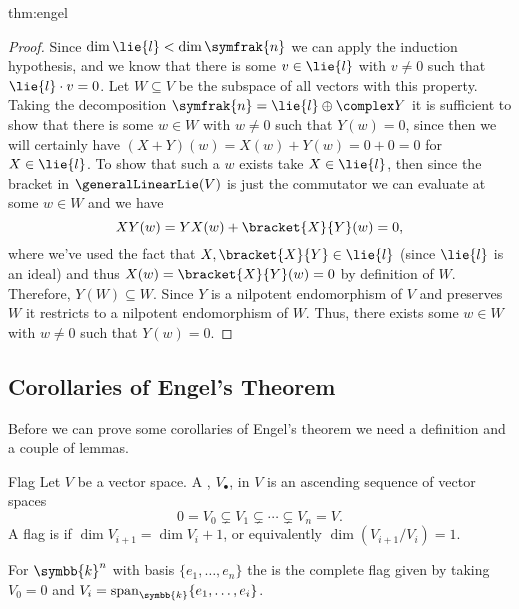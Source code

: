 \documentclass[fleqn]{NotesClass}
\renewcommand{\field}{\symbb{k}}
\DeclareMathOperator{\Span}{span}
\newcommand{\nilpotentLie}{\symfrak{n}}
\begin{document}
\begin{thm}{}{thm:engel}
\begin{proof}
            Since \(\dim \lie{l} < \dim \nilpotentLie\) we can apply the induction hypothesis, and we know that there is some \(v \in \lie{l}\) with \(v \ne 0\) such that \(\lie{l} \cdot v = 0\).
            Let \(W \subseteq V\) be the subspace of all vectors with this property.
            Taking the decomposition \(\nilpotentLie = \lie{l} \oplus \complex Y\) it is sufficient to show that there is some \(w \in W\) with \(w \ne 0\) such that \(Y(w) = 0\), since then we will certainly have \((X + Y)(w) = X(w) + Y(w) = 0 + 0 = 0\) for \(X \in \lie{l}\).
            To show that such a \(w\) exists take \(X \in \lie{l}\), then since the bracket in \(\generalLinearLie(V)\) is just the commutator we can evaluate at some \(w \in W\) and we have
            \begin{equation}
                XY(w) = YX(w) + \bracket{X}{Y}(w) = 0,
            \end{equation}
            where we've used the fact that \(X, \bracket{X}{Y} \in \lie{l}\) (since \(\lie{l}\) is an ideal) and thus \(X(w) = \bracket{X}{Y}(w) = 0\) by definition of \(W\).
            Therefore, \(Y(W) \subseteq W\).
            Since \(Y\) is a nilpotent endomorphism of \(V\) and preserves \(W\) it restricts to a nilpotent endomorphism of \(W\).
            Thus, there exists some \(w \in W\) with \(w \ne 0\) such that \(Y(w) = 0\).
        \end{proof}
    \end{thm}
    
    \subsection{Corollaries of Engel's Theorem}
    Before we can prove some corollaries of Engel's theorem we need a definition and a couple of lemmas.
    
    \begin{dfn}{Flag}{}
        Let \(V\) be a vector space.
        A , \(V_{\bullet}\), in \(V\) is an ascending sequence of vector spaces
        \begin{equation}
            0 = V_0 \subsetneq V_1 \subsetneq \dotsb \subsetneq V_n = V.
        \end{equation}
        A flag is  if \(\dim V_{i+1} = \dim V_i + 1\), or equivalently \(\dim(V_{i+1}/V_i) = 1\).
        
        For \(\field^n\) with basis \(\{e_1, \dotsc, e_n\}\) the  is the complete flag given by taking \(V_0 = 0\) and \(V_i = \Span_{\field}\{e_1, \dotsc, e_i\}\).
    \end{dfn}
    
\end{document}
